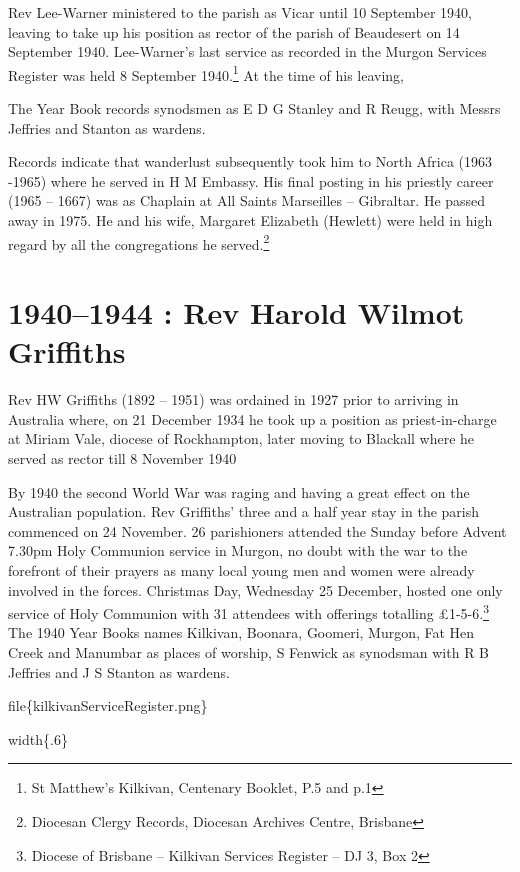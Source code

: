 Rev Lee-Warner ministered to the parish as Vicar until 10 September
1940, leaving to take up his position as rector of the parish of
Beaudesert on 14 September 1940. Lee-Warner's last service as recorded
in the Murgon Services Register was held 8 September 1940.\footnote{St
  Matthew's Kilkivan, Centenary Booklet, P.5 and p.1} At the time of his
leaving,

The Year Book records synodsmen as E D G Stanley and R Reugg, with
Messrs Jeffries and Stanton as wardens.

Records indicate that wanderlust subsequently took him to North Africa
(1963 -1965) where he served in H M Embassy. His final posting in his
priestly career (1965 -- 1667) was as Chaplain at All Saints Marseilles
-- Gibraltar. He passed away in 1975. He and his wife, Margaret
Elizabeth (Hewlett) were held in high regard by all the congregations he
served.\footnote{Diocesan Clergy Records, Diocesan Archives Centre,
  Brisbane}

\hypertarget{rev-harold-wilmot-griffiths}{%
\chapter{1940--1944 : Rev Harold Wilmot
Griffiths}\label{rev-harold-wilmot-griffiths}}

Rev HW Griffiths (1892 -- 1951) was ordained in 1927 prior to arriving
in Australia where, on 21 December 1934 he took up a position as
priest-in-charge at Miriam Vale, diocese of Rockhampton, later moving to
Blackall where he served as rector till 8 November 1940

By 1940 the second World War was raging and having a great effect on the
Australian population. Rev Griffiths' three and a half year stay in the
parish commenced on 24 November. 26 parishioners attended the Sunday
before Advent 7.30pm Holy Communion service in Murgon, no doubt with the
war to the forefront of their prayers as many local young men and women
were already involved in the forces. Christmas Day, Wednesday 25
December, hosted one only service of Holy Communion with 31 attendees
with offerings totalling £1-5-6.\footnote{Diocese of Brisbane --
  Kilkivan Services Register -- DJ 3, Box 2} The 1940 Year Books names
Kilkivan, Boonara, Goomeri, Murgon, Fat Hen Creek and Manumbar as places
of worship, S Fenwick as synodsman with R B Jeffries and J S Stanton as
wardens.

file\{kilkivanServiceRegister.png\}

width\{.6\}

